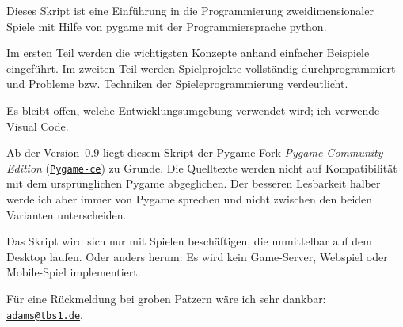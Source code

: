 Dieses Skript ist eine Einführung in die Programmierung zweidimensionaler Spiele mit Hilfe von \Gls{pygame} mit der Programmiersprache \Gls{python}. 

Im ersten Teil werden die wichtigsten Konzepte anhand einfacher Beispiele eingeführt. Im zweiten Teil werden Spielprojekte vollständig durchprogrammiert und Probleme bzw. Techniken der Spieleprogrammierung verdeutlicht.

Es bleibt offen, welche Entwicklungsumgebung verwendet wird; ich verwende Visual Code.

Ab der Version~$0.9$ liegt diesem Skript der Pygame-Fork \emph{Pygame Community Edition} (\href{https://pyga.me/}{\nolinkurl{Pygame-ce}}) zu Grunde. Die Quelltexte werden nicht auf Kompatibilität mit dem ursprünglichen Pygame abgeglichen. Der besseren Lesbarkeit halber werde ich aber immer von Pygame sprechen und nicht zwischen den beiden Varianten unterscheiden.

Das Skript wird sich nur mit Spielen beschäftigen, die unmittelbar auf dem Desktop laufen. Oder anders herum: Es wird kein Game-Server, Webspiel oder Mobile-Spiel implementiert. 

Für eine Rückmeldung bei groben Patzern wäre ich sehr dankbar: \href{mailto:adams@tbs1.de}{\nolinkurl{adams@tbs1.de}}.



